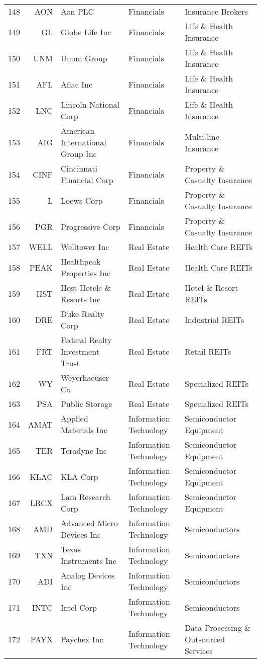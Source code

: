 \documentclass[aps, pra, groupedaddress, showkeys, twocolumn, floatfix, 10pt]{revtex4-2}
\begin{document}
{\begin{longtable}{rrllp{4cm}}
148&AON&Aon PLC&Financials&Insurance Brokers \\
149&GL&Globe Life Inc&Financials&Life \& Health Insurance \\
150&UNM&Unum Group&Financials&Life \& Health Insurance \\
151&AFL&Aflac Inc&Financials&Life \& Health Insurance \\
152&LNC&Lincoln National Corp&Financials&Life \& Health Insurance \\
153&AIG&American International Group Inc&Financials&Multi-line Insurance \\
154&CINF&Cincinnati Financial Corp&Financials&Property \& Casualty Insurance \\
155&L&Loews Corp&Financials&Property \& Casualty Insurance \\
156&PGR&Progressive Corp&Financials&Property \& Casualty Insurance \\
157&WELL&Welltower Inc&Real Estate&Health Care REITs \\
158&PEAK&Healthpeak Properties Inc&Real Estate&Health Care REITs \\
159&HST&Host Hotels \& Resorts Inc&Real Estate&Hotel \& Resort REITs \\
160&DRE&Duke Realty Corp&Real Estate&Industrial REITs \\
161&FRT&Federal Realty Investment Trust&Real Estate&Retail REITs \\
162&WY&Weyerhaeuser Co&Real Estate&Specialized REITs \\
163&PSA&Public Storage&Real Estate&Specialized REITs \\
164&AMAT&Applied Materials Inc&Information Technology&Semiconductor Equipment \\
165&TER&Teradyne Inc&Information Technology&Semiconductor Equipment \\
166&KLAC&KLA Corp&Information Technology&Semiconductor Equipment \\
167&LRCX&Lam Research Corp&Information Technology&Semiconductor Equipment \\
168&AMD&Advanced Micro Devices Inc&Information Technology&Semiconductors \\
169&TXN&Texas Instruments Inc&Information Technology&Semiconductors \\
170&ADI&Analog Devices Inc&Information Technology&Semiconductors \\
171&INTC&Intel Corp&Information Technology&Semiconductors \\
172&PAYX&Paychex Inc&Information Technology&Data Processing \& Outsourced Services \\

\end{longtable}}
\end{document}
